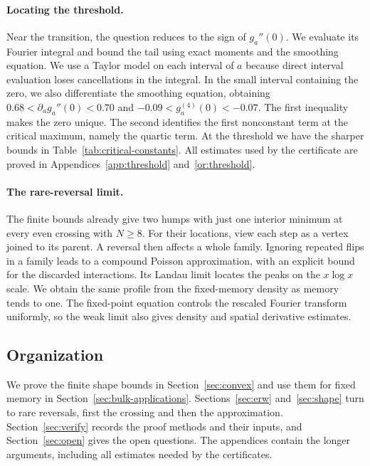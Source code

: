 \paragraph{Locating the threshold.}
Near the transition, the question reduces to the sign of $g_a''(0)$.
We evaluate its Fourier integral and bound the tail using exact
moments and the smoothing equation. We use a Taylor model on each
interval of $a$ because direct interval evaluation loses cancellations
in the integral. In the small interval containing the zero, we also
differentiate the smoothing equation, obtaining
$0.68<\partial_a g_a''(0)<0.70$ and
$-0.09<g_a^{(4)}(0)<-0.07$. The first inequality makes the zero unique.
The second identifies the first nonconstant term at the critical maximum,
namely the quartic term. At the threshold we have the sharper bounds
in Table~\ref{tab:critical-constants}. All estimates used by the
certificate are proved in
Appendices~\ref{app:threshold} and~\ref{or:threshold}.

\paragraph{The rare-reversal limit.}
The finite bounds already give two humps with just one interior minimum
at every even crossing with $N\ge8$. For their locations, view each
step as a vertex joined to its parent. A reversal then affects a whole
family. Ignoring repeated flips in a family leads to a compound
Poisson approximation, with an explicit bound for the discarded
interactions. Its Landau limit locates the peaks on the $x\log x$
scale. We obtain the same profile from the fixed-memory density as
memory tends to one. The fixed-point equation controls the rescaled
Fourier transform uniformly, so the weak limit also gives density
and spatial derivative estimates.

\subsection{Organization}\label{sec:organization}

We prove the finite shape bounds in Section~\ref{sec:convex} and use
them for fixed memory in Section~\ref{sec:bulk-applications}.
Sections~\ref{sec:erw} and~\ref{sec:shape} turn to rare reversals,
first the crossing and then the approximation.
Section~\ref{sec:verify} records the proof methods and their inputs,
and Section~\ref{sec:open} gives the open questions.
The appendices contain the longer arguments, including all estimates
needed by the certificates.

